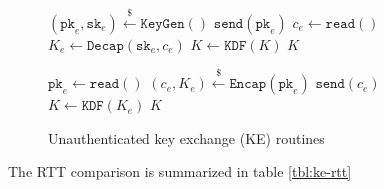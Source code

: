 \documentclass[journal=tches,submission]{iacrtrans}
\newcommand{\keygen}{\texttt{KeyGen}}
\newcommand{\encap}{\texttt{Encap}}
\newcommand{\decap}{\texttt{Decap}}
\newcommand{\pk}{\texttt{pk}}
\newcommand{\sk}{\texttt{sk}}
\newcommand{\leftsample}{\stackrel{\$}{\leftarrow}}
\begin{document}
\begin{figure}[H]
    \centering
    \begin{minipage}[b]{0.49\textwidth}
        \begin{algorithm}[H]
            \caption*{$\texttt{KE}_\texttt{C}()$}\label{alg:ke-client}
            \begin{algorithmic}[1]
                \State $(\pk_e, \sk_e) \leftsample \keygen()$
                \State $\texttt{send}(\pk_e)$
                \State $c_e \leftarrow \texttt{read}()$
                \State $K_e \leftarrow \decap(\sk_e, c_e)$
                \State $K \leftarrow \texttt{KDF}(K)$
                \State \Return $K$
            \end{algorithmic}
        \end{algorithm}
    \end{minipage}\hfill
    \begin{minipage}[b]{0.49\textwidth}
            \begin{algorithm}[H]
                \caption*{$\texttt{KE}_\texttt{S}()$}\label{alg:ke-server}
                \begin{algorithmic}[1]
                    \State $\pk_e \leftarrow \texttt{read}()$
                    \State $(c_e, K_e) \leftsample \encap(\pk_e)$
                    \State $\texttt{send}(c_e)$
                    \State $K \leftarrow \texttt{KDF}(K_e)$
                    \State \Return $K$
                \end{algorithmic}
            \end{algorithm}
    \end{minipage}

    \caption{Unauthenticated key exchange (KE) routines}\label{fig:ke-routines}
\end{figure}

The RTT comparison is summarized in table \ref{tbl:ke-rtt}
\end{document}
